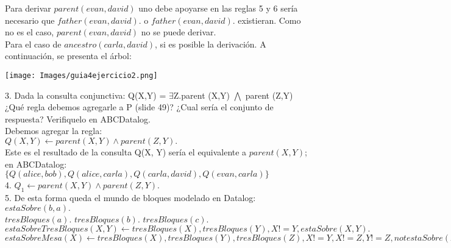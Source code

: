 Para derivar $parent(evan, david)$ uno debe apoyarse en las reglas 5 y 6 sería necesario que $father(evan, david).$ o $father(evan, david).$ existieran. Como no es el caso, $parent(evan, david)$ no se puede derivar. \\

Para el caso de $ancestro(carla, david)$, si es posible la derivación. A continuación, se presenta el árbol: \\

\begin{center}
	\texttt{[image: Images/guia4ejercicio2.png]}
	\label{fig:overview}
\end{center}



3. Dada la consulta conjunctiva: Q(X,Y) = $\exists$Z.parent (X,Y) $\bigwedge$ parent (Z,Y) ¿Qué regla debemos agregarle a P (slide 49)? ¿Cual sería el conjunto de respuesta? Verifiquelo en ABCDatalog.\\

Debemos agregar la regla:\\

$Q(X, Y) \gets parent(X, Y) \land parent(Z, Y).$\\

Este es el resultado de la consulta Q(X, Y) sería el equivalente a $parent(X, Y)$; en ABCDatalog: \\

$\{Q(alice, bob), Q(alice, carla), Q(carla, david), Q(evan, carla)\}$ \\

4. $Q_{1} \gets parent(X, Y) \land parent(Z, Y).$\\



5. De esta forma queda el mundo de bloques modelado en Datalog: \\

$estaSobre(b, a).$\\

$tresBloques(a).$
$tresBloques(b).$
$tresBloques(c).$\\

$estaSobreTresBloques(X, Y) \gets tresBloques(X), tresBloques(Y), X != Y, estaSobre(X, Y).$ \\

$estaSobreMesa(X) \gets tresBloques(X), tresBloques(Y), tresBloques(Z), X != Y,  X != Z, Y != Z, not estaSobre(X, Y), not estaSobre(X, Z).$\\

